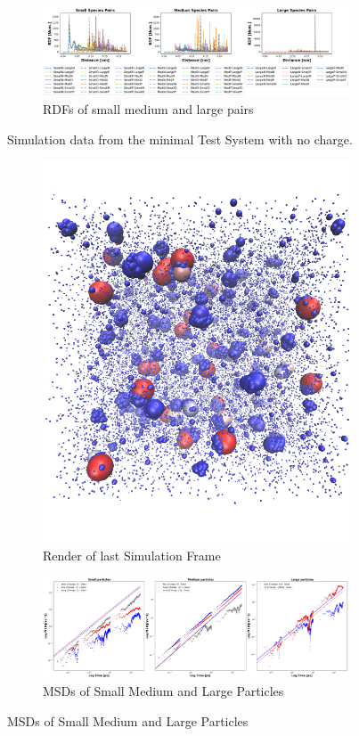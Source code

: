 \documentclass[draft, english]{volcanica-template}
\begin{document}
\begin{figure}[!htbp]
\begin{figure}[!htbp]
\centering
\includegraphics[width=0.7\linewidth]{files/Pairwise_RDFs_ij-d6ee9f07154673f560979575ab373c4a.png}
\caption[]{RDFs of small medium and large pairs}
\label{Fig7_NoQTestSys-d}
\end{figure}
\caption[]{Simulation data from the minimal Test System with no charge.}
\label{Fig7_NoQTestSys-d}
\end{figure}

\begin{figure}[!htbp]
\centering
\begin{figure}[!htbp]
\centering
\includegraphics[width=0.7\linewidth]{files/ChargeRender-468ec6f8a22c2aa5aa7249c8b9821a74.png}
\caption[]{Render of last Simulation Frame}
\label{Fig8}
\end{figure}

\begin{figure}[!htbp]
\centering
\includegraphics[width=0.7\linewidth]{files/Combined_MSD-ffee744e2bf7b87ed71936f5272207b0.png}
\caption[]{MSDs of Small Medium and Large Particles}
\label{Fig8_CytoSys-b}
\end{figure}


\end{figure}
\end{document}
